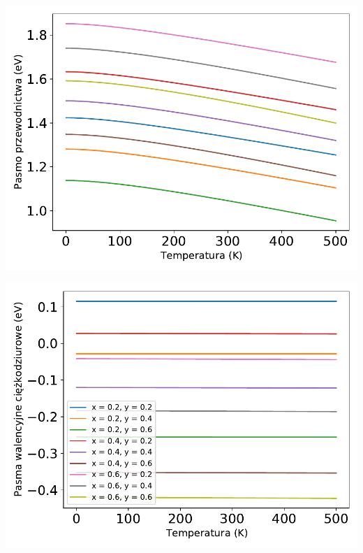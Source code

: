 \documentclass[12pt,openany,a4paper]{book}
\begin{document}
\begin{minipage}[t]{0.5\textwidth}
	\includegraphics[width = \linewidth]{Figures/strain/Ec2.pdf}\label{fig:Ec2}
\end{minipage}
\begin{minipage}[t]{0.5\textwidth}
	\includegraphics[width = \linewidth]{Figures/strain/Ev_hh2.pdf}\label{fig:Ev_hh2}
\end{minipage}
\end{document}

